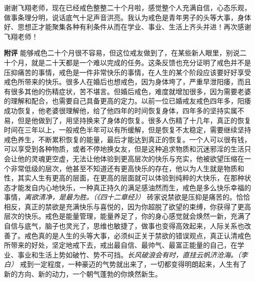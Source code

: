 \begin{case}
    谢谢飞翔老师，现在已经戒色整整二十个月啦，感觉整个人充满自信，心态乐观，做事条理分明，说话底气十足声音洪亮。我认为戒色是青年男子的头等大事，身体好、思想正才能聚集各种有利条件从而在学业、事业、生活上齐头并进！再次感谢飞翔老师！

    \textbf{附评} 能够戒色二十个月很不容易，但这位戒友做到了，在某些新人眼里，别说二十个月，就是二十天都是一个难以完成的任务。这条反馈也充分证明了戒色并不是压抑痛苦的事情，戒色是一件非常快乐的事情，在人生的某个阶段应该要好好享受戒色所带来的快乐。很多人在婚后也想戒色，因为身体垮了，严重早泄阳痿，而且有很多其他的伤精症状，苦不堪言。但婚后戒色，难度就增加很多，因为需要老婆的理解和配合，也需要自己具备更高的定力。以前一位已婚戒友戒色四年多，阳痿成功恢复，他老婆很理解他，给了他四年的时间恢复身体，四年多的坚持实属不易，但是他做到了，用坚持换来了身体的恢复。很多人伤精了十几年，真正的恢复时间在三年以上，一般戒色半年可以有所缓解，但是恢复不太稳定，需要继续坚持戒色养生，不断累积恢复的能量，最后才能达到真正的恢复。一个人可以很有钱，可以享受到各种物质，或者不停地换女友，但是这种追求物质和沉迷邪淫的生活只会让他的灵魂更空虚，无法让他体验到更高层次的快乐与充实，他被欲望压缩在一个非常低级的层次，他甚至不知道还有更高快乐的存在，他以为人生就是物质和性，其实人生有更高的层面，在更高的层面就可以体验到纯粹的大快乐，在那种状态才能发自内心地快乐，一种真正持久的满足感油然而生，戒色是多么快乐幸福的事情，\textit{离欲清净，是最为胜。（《四十二章经》）} 砖家说禁欲是压抑是痛苦的。恰恰相反，真正的禁欲是充满快乐与喜悦的，因为你超脱了欲望的束缚，你获得了更高层次的快乐。戒色是能量管理，能量养足了，你的身心感觉就会焕然一新，充满了自信与底气，脑子也灵光了，思维也敏捷了，做事也变得高效起来，人际关系也改善了。戒色真的是人生的头等大事，必须纠正关于禁欲的错误观点，真正认清戒色所带来的好处，坚定地戒下去，戒出最自信、最帅气、最富正能量的自己，在学业、事业和生活上势如破竹、势不可挡。\textit{长风破浪会有时，直挂云帆济沧海。（李白）} 戒到一定程度，一种豪迈的气势就出来了，一切都变得明朗起来，人生有了新的方向、新的动力，一个朝气蓬勃的你焕然新生。
\end{case}

